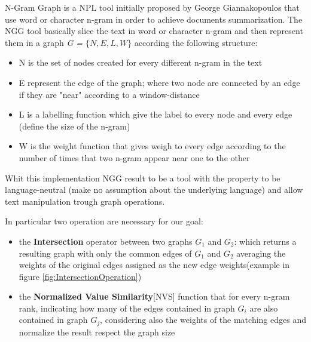 N-Gram Graph is a NPL tool initially proposed by George Giannakopoulos \cite{Ngram} that use word or character n-gram in order to achieve documents summarization. The NGG tool basically slice the text in word or character n-gram and then represent them in a graph \emph{G = $\lbrace N,E,L,W\rbrace$} according the following structure:
\begin{itemize}
	\item N is the set of nodes created for every different n-gram in the text
	\item E represent the edge of the graph; where two node are connected by an edge if they are "near" according to a window-distance
	\item L is a labelling function which give the label to every node and every edge (define the size of the n-gram)
	\item W is the weight function that gives weigh to every edge according to the number of times that two n-gram appear near one to the other
\end{itemize}

Whit this implementation NGG  result to be a tool with the property to be language-neutral (make no assumption about the underlying language) and allow text manipulation trough graph operations.

In particular two operation are necessary for our goal:
\begin{itemize}
\item the \textbf{Intersection} operator between two graphs $G_1$ and $G_2$: which returns a resulting graph with only the common edges of $G_1$ and $G_2$ averaging the weights of the original edges assigned as the new edge weights(example in figure \ref{fig:IntersectionOperation})
\item the \textbf{Normalized Value Similarity}[NVS] function that for every n-gram rank, indicating how many of the edges contained in graph $G_i$ are also contained in graph $G_j$, considering also the weights of the matching edges and normalize the result respect the graph size
\end{itemize}
 
